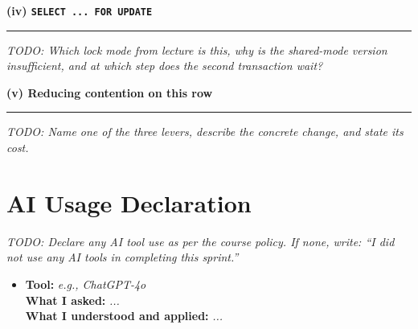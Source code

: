 \documentclass[11pt, a4paper]{article}
\newcommand{\divider}{\par\noindent\rule{\linewidth}{0.3pt}\smallskip}
\begin{document}
\bigskip
\textbf{(iv) \texttt{SELECT ... FOR UPDATE}}
\divider

\textit{TODO: Which lock mode from lecture is this, why is the shared-mode
version insufficient, and at which step does the second transaction wait?}

\bigskip
\textbf{(v) Reducing contention on this row}
\divider

\textit{TODO: Name one of the three levers, describe the concrete change,
and state its cost.}

\section{AI Usage Declaration}

\textit{TODO: Declare any AI tool use as per the course policy. If none,
write: ``I did not use any AI tools in completing this sprint.''}

\begin{itemize}
  \item \textbf{Tool:} \textit{e.g., ChatGPT-4o} \\
        \textbf{What I asked:} \textit{...} \\
        \textbf{What I understood and applied:} \textit{...}
\end{itemize}
\end{document}
